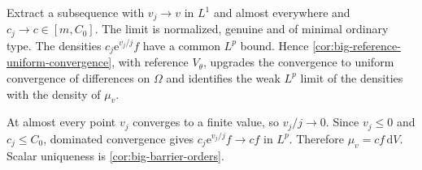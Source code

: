 Extract a subsequence with $v_j\to v$ in $L^1$ and almost everywhere and
$c_j\to c\in[m,C_0]$. The limit is normalized, genuine and of minimal
ordinary type. The densities $c_j\mathrm{e}^{v_j/j}f$ have a common
$L^p$ bound. Hence \cref{cor:big-reference-uniform-convergence}, with
reference $V_\theta$, upgrades the convergence to uniform convergence of
differences on $\Omega$ and identifies the weak $L^p$ limit of the
densities with the density of $\mu_v$.

At almost every point $v_j$ converges to a finite value, so $v_j/j\to0$.
Since $v_j\leq0$ and $c_j\leq C_0$, dominated convergence gives
$c_j\mathrm{e}^{v_j/j}f\to cf$ in $L^p$. Therefore
$\mu_v=cf\,\mathrm{d}V$. Scalar uniqueness is
\cref{cor:big-barrier-orders}.
